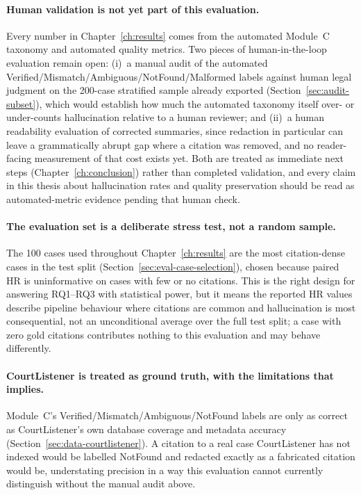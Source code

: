 \paragraph{Human validation is not yet part of this evaluation.} Every number in Chapter~\ref{ch:results} comes from the automated Module~C taxonomy and automated quality metrics. Two pieces of human-in-the-loop evaluation remain open: (i)~a manual audit of the automated Verified/Mismatch/Ambiguous/NotFound/Malformed labels against human legal judgment on the 200-case stratified sample already exported (Section~\ref{sec:audit-subset}), which would establish how much the automated taxonomy itself over- or under-counts hallucination relative to a human reviewer; and (ii)~a human readability evaluation of corrected summaries, since redaction in particular can leave a grammatically abrupt gap where a citation was removed, and no reader-facing measurement of that cost exists yet. Both are treated as immediate next steps (Chapter~\ref{ch:conclusion}) rather than completed validation, and every claim in this thesis about hallucination rates and quality preservation should be read as automated-metric evidence pending that human check.

\paragraph{The evaluation set is a deliberate stress test, not a random sample.} The 100 cases used throughout Chapter~\ref{ch:results} are the most citation-dense cases in the test split (Section~\ref{sec:eval-case-selection}), chosen because paired HR is uninformative on cases with few or no citations. This is the right design for answering RQ1--RQ3 with statistical power, but it means the reported HR values describe pipeline behaviour where citations are common and hallucination is most consequential, not an unconditional average over the full test split; a case with zero gold citations contributes nothing to this evaluation and may behave differently.

\paragraph{CourtListener is treated as ground truth, with the limitations that implies.} Module~C's Verified/Mismatch/Ambiguous/NotFound labels are only as correct as CourtListener's own database coverage and metadata accuracy (Section~\ref{sec:data-courtlistener}). A citation to a real case CourtListener has not indexed would be labelled NotFound and redacted exactly as a fabricated citation would be, understating precision in a way this evaluation cannot currently distinguish without the manual audit above.


